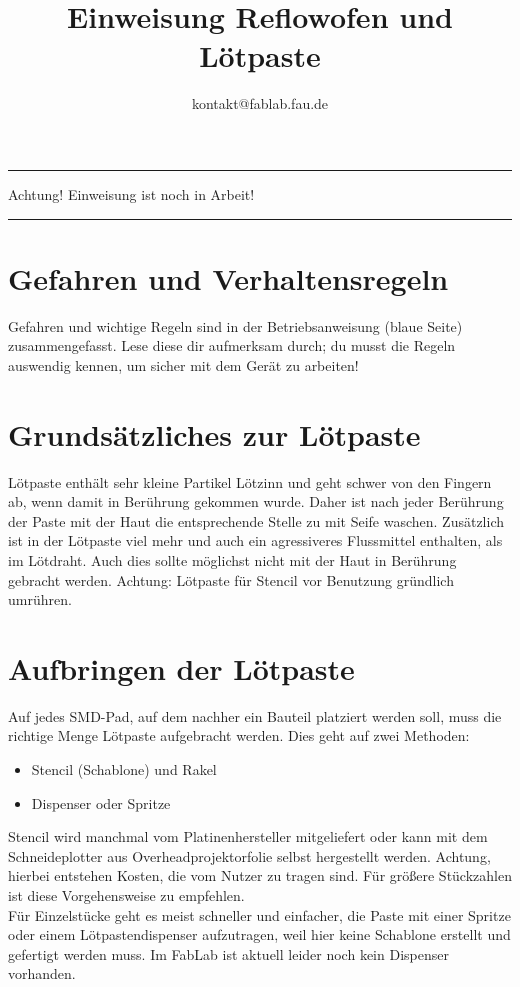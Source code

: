 \documentclass{\basedir/fablab-document}
\author{kontakt@fablab.fau.de}
\title{Einweisung Reflowofen und Lötpaste}
\begin{document}
\color{red}
\hrule
\begin{center}
\large{Achtung! Einweisung ist noch in Arbeit!}
\vspace{0.1cm}
\end{center}
\hrule
\color{black}
\tableofcontents

\section{Gefahren und Verhaltensregeln}
Gefahren und wichtige Regeln sind in der Betriebsanweisung (blaue Seite) zusammengefasst. Lese diese dir aufmerksam durch; du musst die Regeln auswendig kennen, um sicher mit dem Gerät zu arbeiten!


\section{Grundsätzliches zur Lötpaste}
Lötpaste enthält sehr kleine Partikel Lötzinn und geht schwer von den Fingern ab, wenn damit in Berührung gekommen wurde. Daher ist nach jeder Berührung der Paste mit der Haut die entsprechende Stelle zu mit Seife waschen. Zusätzlich ist in der Lötpaste viel mehr und auch ein agressiveres Flussmittel enthalten, als im Lötdraht. Auch dies sollte möglichst nicht mit der Haut in Berührung gebracht werden. Achtung: Lötpaste für Stencil vor Benutzung gründlich umrühren.

\section{Aufbringen der Lötpaste}
Auf jedes SMD-Pad, auf dem nachher ein Bauteil platziert werden soll, muss die richtige Menge Lötpaste aufgebracht werden. Dies geht auf zwei Methoden:
\begin{itemize}
	\item Stencil (Schablone) und Rakel
	\item Dispenser oder Spritze
\end{itemize}
Stencil wird manchmal vom Platinenhersteller mitgeliefert oder kann mit dem Schneideplotter aus Overheadprojektorfolie selbst hergestellt werden. Achtung, hierbei entstehen Kosten, die vom Nutzer zu tragen sind. Für größere Stückzahlen ist diese Vorgehensweise zu empfehlen.\\
Für Einzelstücke geht es meist schneller und einfacher, die Paste mit einer Spritze oder einem Lötpastendispenser aufzutragen, weil hier keine Schablone erstellt und gefertigt werden muss. Im FabLab ist aktuell leider noch kein Dispenser vorhanden.
\end{document}
